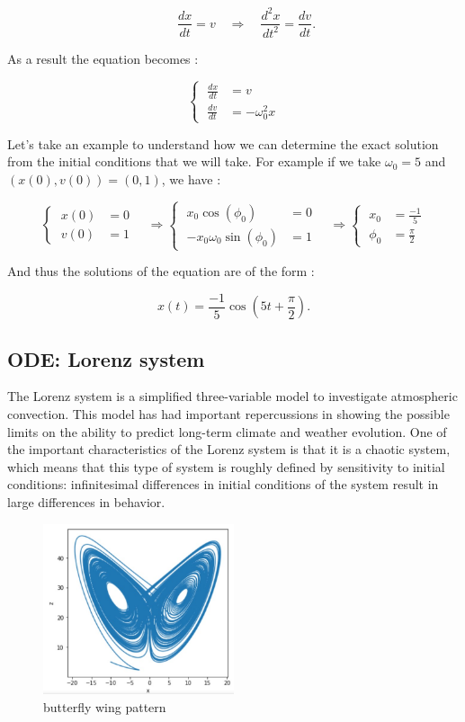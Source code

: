 \documentclass[12pt]{article}
\begin{document}
    $$\qquad \frac{d x}{d t}=v \quad \Rightarrow \quad \frac{d^2 x}{d t^2}=\frac{d v}{d t}.$$
    
    \noindent As a result the equation becomes :
    
    $$\left\{\;\begin{aligned}
    	\frac{d x}{d t}&=v \\
    	\frac{d v}{d t}&=-\omega_0^2 x
    \end{aligned}\right.
    $$
    
    \noindent Let's take an example to understand how we can determine the exact solution from the initial conditions that we will take. For example if we take $\omega_0=5$ and $(x(0),v(0))=(0,1)$, we have :
    
    $$\left\{\;\begin{aligned}
    	x(0)&=0 \\
    	v(0)&=1
    \end{aligned}\right. \quad \Rightarrow 
    \left\{\;\begin{aligned}
    	x_0 \cos(\phi_0)&=0 \\
    	-x_0 \omega_{0} \sin(\phi_0)&=1
    \end{aligned}\right.  \quad \Rightarrow  
    \left\{\;\begin{aligned}
    	x_0&=\frac{-1}{5} \\
    	\phi_0&=\frac{\pi}{2}
    \end{aligned}\right.
    $$
    
    \noindent And thus the solutions of the equation are of the form :
    
    $$x(t) = \frac{-1}{5}\cos(5t+\frac{\pi}{2}).$$
    \subsection{ODE: Lorenz system}

	\noindent The Lorenz system is a simplified three-variable model to investigate atmospheric convection. This model has had important repercussions in showing the possible limits on the ability to predict long-term climate and weather evolution. One of the important characteristics of the Lorenz system is 
	that it is a chaotic system, which means that this type of system is roughly defined by sensitivity to initial conditions: infinitesimal differences in initial conditions of the system result in large differences in behavior.
	\begin{figure}[H]   
		\centering
		\includegraphics[width=0.5\textwidth]{"images/butterfly.jpg"}
		\caption{butterfly wing pattern}
		\label{but_wing}
	\end{figure}	
	
\end{document}
